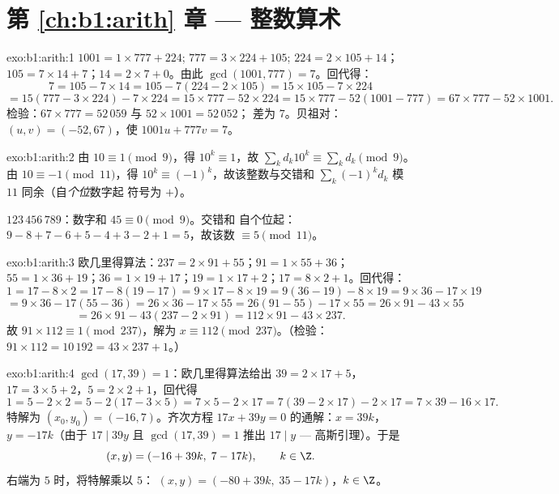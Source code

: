 \section*{第 \ref{ch:b1:arith} 章 --- 整数算术}

\begin{solution}{exo:b1:arith:1}
$1001 = 1 \times 777 + 224$; $777 = 3 \times 224 + 105$; $224 = 2
\times 105 + 14$；$105 = 7 \times 14 + 7$；$14 = 2 \times 7 + 0$。由此
$\gcd(1001, 777) = 7$。回代得：
\[
7 = 105 - 7 \times 14
= 105 - 7(224 - 2\times 105) = 15 \times 105 - 7 \times 224
\]
\[
= 15(777 - 3\times 224) - 7\times 224 = 15 \times 777 - 52 \times 224
= 15 \times 777 - 52(1001 - 777) = 67 \times 777 - 52 \times 1001 .
\]
检验：$67 \times 777 = 52\,059$ 与 $52 \times 1001 = 52\,052$；
差为 $7$。贝祖对：$(u, v) = (-52, 67)$，使 $1001u + 777v =
7$。
\end{solution}

\begin{solution}{exo:b1:arith:2}
由 $10 \equiv 1 \pmod 9$，得 $10^k \equiv 1$，故 $\sum_k d_k 10^k
\equiv \sum_k d_k \pmod 9$。由 $10 \equiv -1 \pmod{11}$，得 $10^k
\equiv (-1)^k$，故该整数与交错和
$\sum_k (-1)^k d_k$ 模 $11$ 同余（自\emph{个位}数字起
符号为 $+$）。

$123\,456\,789$：数字和 $45 \equiv 0 \pmod 9$。交错和
自个位起：$9 - 8 + 7 - 6 + 5 - 4 + 3 - 2 + 1 = 5$，故该数
$\equiv 5 \pmod{11}$。
\end{solution}

\begin{solution}{exo:b1:arith:3}
欧几里得算法：$237 = 2 \times 91 + 55$；$91 = 1 \times 55 + 36$；$55 = 1
\times 36 + 19$；$36 = 1 \times 19 + 17$；$19 = 1 \times 17 + 2$；$17
= 8 \times 2 + 1$。回代得：
\[
1 = 17 - 8\times 2 = 17 - 8(19 - 17) = 9\times 17 - 8\times 19
= 9(36 - 19) - 8\times 19 = 9\times 36 - 17\times 19
\]
\[
= 9\times 36 - 17(55 - 36) = 26\times 36 - 17\times 55
= 26(91 - 55) - 17\times 55 = 26\times 91 - 43\times 55
\]
\[
= 26\times 91 - 43(237 - 2\times 91) = 112 \times 91 - 43 \times 237.
\]
故 $91 \times 112 \equiv 1 \pmod{237}$，解为 $x \equiv
112 \pmod{237}$。（检验：$91 \times 112 = 10\,192 = 43 \times 237 +
1$。）
\end{solution}

\begin{solution}{exo:b1:arith:4}
$\gcd(17, 39) = 1$：欧几里得算法给出 $39 = 2\times 17 + 5$，$17 = 3\times
5 + 2$，$5 = 2\times 2 + 1$，回代得
\[
1 = 5 - 2\times 2 = 5 - 2(17 - 3\times 5) = 7\times 5 - 2\times 17
= 7(39 - 2\times 17) - 2\times 17 = 7\times 39 - 16\times 17 .
\]
特解为 $(x_0, y_0) = (-16, 7)$。齐次方程
$17x + 39y = 0$ 的通解：$x = 39k$，$y = -17k$（由于
$17 \mid 39y$ 且 $\gcd(17,39) = 1$ 推出 $17 \mid y$ ---
高斯引理）。于是
\[
(x, y) = (-16 + 39k,\; 7 - 17k), \qquad k \in \Z .
\]
右端为 $5$ 时，将特解乘以 $5$：
$(x, y) = (-80 + 39k,\; 35 - 17k)$，$k \in \Z$。
\end{solution}

